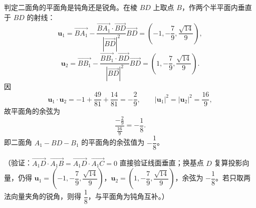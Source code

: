 \begin{answer}
判定二面角的平面角是钝角还是锐角。在棱 \(BD\) 上取点 \(B\)，作两个半平面内垂直于 \(BD\) 的射线：
\nopagebreak[4]
\[
\boldsymbol{u}_1=\overrightarrow{BA_1}-\frac{\overrightarrow{BA_1}\cdot\overrightarrow{BD}}{|\overrightarrow{BD}|^2}\overrightarrow{BD}
=\left(-1,-\frac79,\frac{\sqrt{14}}{9}\right),
\]
\nopagebreak[4]
\[
\boldsymbol{u}_2=\overrightarrow{BB_1}-\frac{\overrightarrow{BB_1}\cdot\overrightarrow{BD}}{|\overrightarrow{BD}|^2}\overrightarrow{BD}
=\left(1,-\frac79,\frac{\sqrt{14}}{9}\right).
\]
因
\nopagebreak[4]
\[
\boldsymbol{u}_1\cdot\boldsymbol{u}_2=-1+\frac{49}{81}+\frac{14}{81}
=-\frac29,\qquad
|\boldsymbol{u}_1|^2=|\boldsymbol{u}_2|^2=\frac{16}{9},
\]
故平面角的余弦为
\nopagebreak[4]
\[
\frac{-\frac29}{\frac{16}{9}}=-\frac18.
\]
即二面角 \(A_1-BD-B_1\) 的平面角的余弦值为 \(-\dfrac18\)。

（验证：\(\overrightarrow{A_1D}\cdot\overrightarrow{A_1B}=\overrightarrow{A_1D}\cdot\overrightarrow{A_1C}=0\) 直接验证线面垂直；换基点 \(D\) 复算投影向量，仍得 \(\boldsymbol{u}_1=\left(-1,-\dfrac79,\dfrac{\sqrt{14}}{9}\right)\)，\(\boldsymbol{u}_2=\left(1,-\dfrac79,\dfrac{\sqrt{14}}{9}\right)\)，余弦为 \(-\dfrac18\)。若只取两法向量夹角的锐角，则得 \(\dfrac18\)，与平面角为钝角互补。）



\end{answer}
